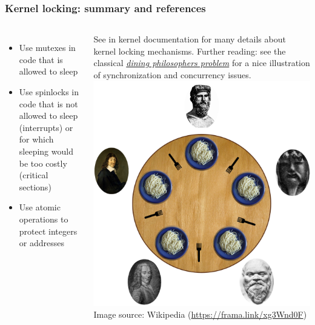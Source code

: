\begin{frame}
  \frametitle{Kernel locking: summary and references}
  \begin{columns}
    \begin{itemize}
    \item Use mutexes in code that is allowed to sleep
    \item Use spinlocks in code that is not allowed to sleep (interrupts)
      or for which sleeping would be too costly (critical sections)
    \item Use atomic operations to protect integers or addresses
    \end{itemize}
    See  in kernel documentation
    for many details about kernel locking mechanisms.
    \small
    Further reading: see the classical
    {\em \href{https://en.wikipedia.org/wiki/Dining_philosophers_problem}
    {dining philosophers problem}} for a nice illustration of synchronization
    and concurrency issues.
    \includegraphics[width=\textwidth]{slides/kernel-driver-development-concurrency/An_illustration_of_the_dining_philosophers_problem.jpg}
    \tiny Image source: Wikipedia (\url{https://frama.link/xg3Wnd0F})
  \end{columns}
\end{frame}
